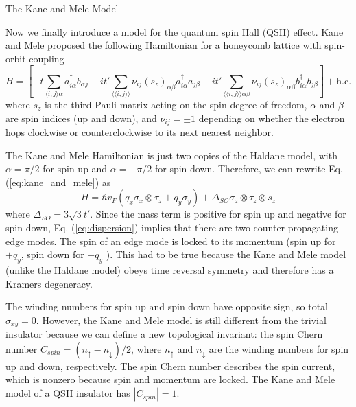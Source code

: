 \documentclass[a4paper,12pt]{article}
\begin{document}
\begin{section}{The Kane and Mele Model}

Now we finally introduce a model for the quantum spin Hall (QSH) effect.  Kane and Mele proposed the following Hamiltonian for a honeycomb lattice with spin-orbit coupling \cite{kane_mele_prl}
\begin{equation}
\label{eq:kane_and_mele}
H= \left[ - t \sum_{\langle i,j \rangle \alpha} a_{i \alpha}^\dagger b_{\alpha j} - i t' \sum_{\langle \langle i,j \rangle \rangle} \nu_{ij} \left( s_z \right)_{\alpha \beta} a_{i \alpha}^\dagger a_{j \beta} - i t' \sum_{\langle \langle i,j \rangle \rangle \alpha \beta} \nu_{ij} \left( s_z \right)_{\alpha \beta} b_{i \alpha}^\dagger b_{j \beta} \right] + \text{h.c.}
\end{equation}
where $s_z$ is the third Pauli matrix acting on the spin degree of freedom, $\alpha$ and $\beta$ are spin indices (up and down), and $\nu_{ij}=\pm 1$ depending on whether the electron hops clockwise or counterclockwise to its next nearest neighbor.

The Kane and Mele Hamiltonian is just two copies of the Haldane model, with $\alpha=\pi/2$ for spin up and $\alpha=-\pi/2$ for spin down.  Therefore, we can rewrite Eq. (\ref{eq:kane_and_mele}) as
\begin{equation}
H=\hbar v_F (q_x \sigma_x \otimes \tau_z + q_y \sigma_y)+\Delta_{SO} \sigma_z \otimes \tau_z \otimes s_z
\end{equation}
where $\Delta_{SO}=3 \sqrt{3} t'$.  Since the mass term is positive for spin up and negative for spin down, Eq. (\ref{eq:dispersion}) implies that there are two counter-propagating edge modes.  The spin of an edge mode is locked to its momentum (spin up for $+q_y$, spin down for $-q_y$%
).  This had to be true because the Kane and Mele model (unlike the Haldane model) obeys time reversal symmetry and therefore has a Kramers degeneracy.


The winding numbers for spin up and spin down have opposite sign, so total $\sigma_{xy}=0$.  However, the Kane and Mele model is still different from the trivial insulator because we can define a new topological invariant: the spin Chern number $C_{spin}=(n_\uparrow-n_\downarrow)/2$, where $n_\uparrow$ and $n_\downarrow$ are the winding numbers for spin up and down, respectively.  The spin Chern number describes the spin current, which is nonzero because spin and momentum are locked.  The Kane and Mele model of a QSH insulator has $|C_{spin}|=1$.


\end{section}
\end{document}
